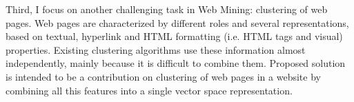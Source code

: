 Third, I focus on another challenging task in Web Mining: clustering of web pages. Web pages are characterized by different roles and several representations, based on textual, hyperlink and HTML formatting (i.e. HTML tags and visual) properties. Existing clustering algorithms use these information almost independently, mainly because it is difficult to combine them. Proposed solution is intended to be a contribution on clustering of web pages in a website by combining all this features into a single vector space representation. 






  

 


